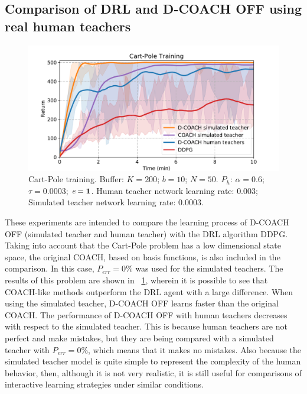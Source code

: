 \subsection{Comparison of DRL and D-COACH OFF using real human teachers}
\begin{figure}[t]
    \centering
    \vspace{-0.2cm}
    \includegraphics[width=0.8\linewidth]{imagenes/cap3/offline_cart_pole_humans.pdf}
    \vspace{-0.2cm}
    \caption{Cart-Pole training. Buffer: $K = 200$; $b = 10$; $N = 50$. $P_{h}$: $\alpha = 0.6$; $\tau = 0.0003$; $\emph{e}=\textbf{1}$. Human teacher network learning rate: $0.003$; Simulated teacher network learning rate: $0.0003$.}
    \label{fig:cartpole_results}
\end{figure}

These experiments are intended to compare the learning process of D-COACH OFF (simulated teacher and human teacher) with the DRL algorithm DDPG. Taking into account that the Cart-Pole problem has a low dimensional state space, the original COACH, based on basis functions, is also included in the comparison. In this case, $P_\mathit{err}=0\%$ was used for the simulated teachers. The results of this problem are shown in \figurename~{\ref{fig:cartpole_results}}, wherein it is possible to see that COACH-like methods outperform the DRL agent with a large difference. When using the simulated teacher, D-COACH OFF learns faster than the original COACH. The performance of D-COACH OFF with human teachers decreases with respect to the simulated teacher. This is because human teachers are not perfect and make mistakes, but they are being compared with a simulated teacher with $P_\mathit{err}=0\%$, which means that it makes no mistakes. Also because the simulated teacher model is quite simple to represent the complexity of the human behavior, then, although it is not very realistic, it is still useful for comparisons of interactive learning strategies under similar conditions.


